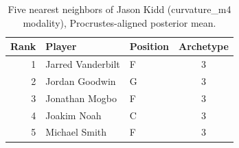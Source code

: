 \begin{table}[htbp]
  \centering\small
  \begin{tabular}{rllc}
    \toprule
    Rank & Player & Position & Archetype \\
    \midrule
    1 & Jarred Vanderbilt & F & 3 \\
    2 & Jordan Goodwin & G & 3 \\
    3 & Jonathan Mogbo & F & 3 \\
    4 & Joakim Noah & C & 3 \\
    5 & Michael Smith & F & 3 \\
    \bottomrule
  \end{tabular}
  \caption{Five nearest neighbors of Jason Kidd (curvature_m4 modality), Procrustes-aligned posterior mean.}
  \label{tab:Jason_Kidd_neighbors_curvature_m4}
\end{table}


